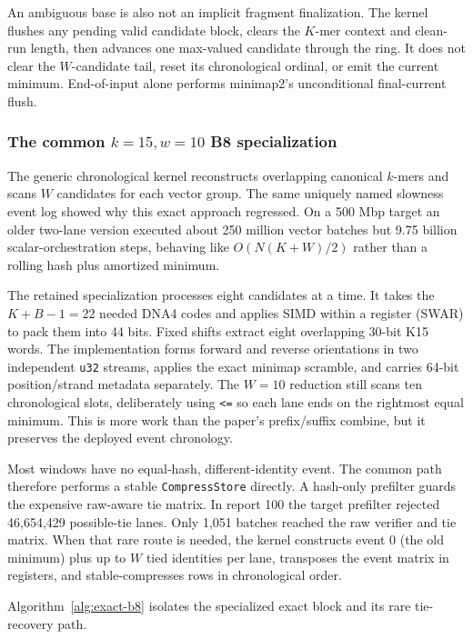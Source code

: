 An ambiguous base is also not an implicit fragment finalization.  The kernel
flushes any pending valid candidate block, clears the $K$-mer context and
clean-run length, then advances one max-valued candidate through the ring.
It does not clear the $W$-candidate tail, reset its chronological ordinal, or
emit the current minimum.  End-of-input alone performs minimap2's
unconditional final-current flush.

\subsubsection{The common $k=15,w=10$ B8 specialization}

The generic chronological kernel reconstructs overlapping canonical $k$-mers
and scans $W$ candidates for each vector group. The same uniquely named
slowness event log showed why this exact approach regressed. On a 500 Mbp
target an older two-lane version executed
about 250 million vector batches but 9.75 billion scalar-orchestration steps,
behaving like $O(N(K+W)/2)$ rather than a rolling hash plus amortized minimum.

The retained specialization processes eight candidates at a time.  It takes
the $K+B-1=22$ needed DNA4 codes and applies SIMD within a register (SWAR) to
pack them into 44 bits.  Fixed shifts extract eight overlapping 30-bit K15
words.  The implementation forms forward and reverse orientations in two
independent \texttt{u32} streams, applies the exact minimap scramble, and
carries 64-bit position/strand metadata separately.  The $W=10$ reduction
still scans ten chronological slots, deliberately using \texttt{<=} so each
lane ends on the rightmost equal minimum.  This is more work than the paper's
prefix/suffix combine, but it preserves the deployed event chronology.

Most windows have no equal-hash, different-identity event.  The common path
therefore performs a stable \texttt{CompressStore} directly.  A hash-only
prefilter guards the expensive raw-aware tie matrix.  In report 100 the target
prefilter rejected 46,654,429 possible-tie lanes. Only 1,051 batches reached
the raw verifier and tie matrix.  When that rare route is needed, the kernel
constructs event 0 (the old minimum) plus up to $W$ tied identities per lane,
transposes the event matrix in registers, and stable-compresses rows in
chronological order.

Algorithm~\ref{alg:exact-b8} isolates the specialized exact block and its rare
tie-recovery path.

